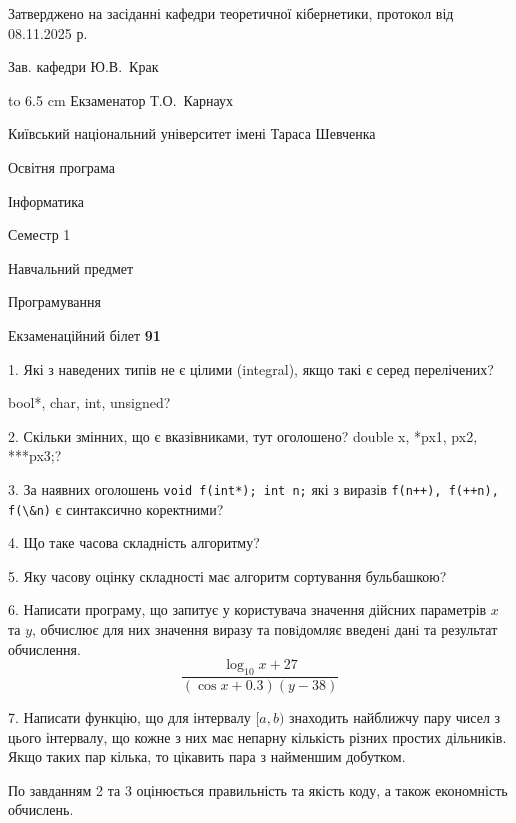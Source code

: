 \documentclass[12pt, ukrainian]{article}
\def\code#1{\Verb!#1!}
\begin{document}
{\smallskip\smallskip \begin {scriptsize} Затверджено на засіданні кафедри теоретичної кібернетики, протокол   від   08.11.2025 р.\par\smallskip\smallskip\smallskip\smallskip
{\parbox {6.5 cm} {Зав. кафедри \dotfill Ю.В.~Крак}}\hspace {0.7cm} {\hbox to 6.5 cm { Екзаменатор \dotfill Т.О.~Карнаух}} \end{scriptsize}}
\newpage
{{\begin {scriptsize}\par
{ \center  Київський національний університет імені Тараса Шевченка \par}
{\parbox {5 cm}{Освітня програма \hfill}{\parbox {7 cm}{Інформатика\hfill}}\parbox {6 cm}{\hfill Семестр 1}}\par
{\parbox {5 cm} {Навчальний предмет \hfill}\parbox {7 cm}{Програмування \hfill}\parbox {6cm}{\hfill}\par}\vspace{-15pt} \end{scriptsize}}{\center Екзаменаційний білет \No \textbf { 91 }\par}}
{%
1. Які з наведених типів не є цілими (integral), якщо такі є серед перелічених?

bool*, char, int, unsigned?
\par
\vspace{2mm}
2. Скільки змінних, що є вказівниками, тут оголошено?
double x, *px1, px2, ***px3;?
\par
\vspace{2mm}
3. За наявних оголошень \code{void f(int*); int n;} які з виразів \code{f(n++), f(++n), f(\&n)} є синтаксично коректними?
\par
\vspace{2mm}
4. Що таке часова складність алгоритму?
\par
\vspace{2mm}
5. Яку часову оцінку складності має алгоритм сортування бульбашкою?
\par
\vspace{2mm}
6. Написати програму, що запитує у користувача значення дійсних параметрів $x$ та $y$, обчислює для них значення виразу та повiдомляє введенi данi та результат обчислення.
$$\frac{\log_{10} x + 27}{(\cos x + 0.3) (y - 38)}$$ 

\par
7. Написати функцію, що для інтервалу $[a, b)$ знаходить найближчу пару чисел з цього інтервалу, що кожне з них має непарну кількість різних простих дільників. Якщо таких пар кілька, то цікавить пара з найменшим добутком.

По завданням 2 та 3 оцінюється правильність та якість коду, а також економність обчислень.

}
\end{document}
